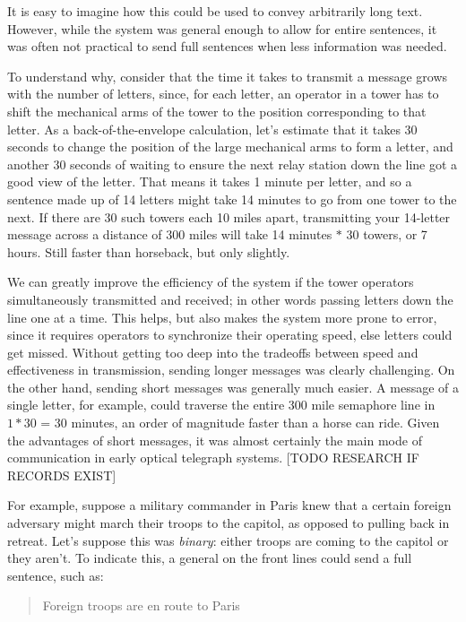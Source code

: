 \documentclass[UTF8]{book}
\begin{document}
\begin{CJK}{UTF8}{gbsn}
It is easy to imagine how this could be used to convey arbitrarily long text. However, while the system was general enough to allow for entire sentences, it was often not practical to send full sentences when less information was needed.

To understand why, consider that the time it takes to transmit a message grows with the number of letters, since, for each letter, an operator in a tower has to shift the mechanical arms of the tower to the position corresponding to that letter. As a back-of-the-envelope calculation, let's estimate that it takes 30 seconds to change the position of the large mechanical arms to form a letter, and another 30 seconds of waiting to ensure the next relay station down the line got a good view of the letter. That means it takes 1 minute per letter, and so a sentence made up of 14 letters might take 14 minutes to go from one tower to the next. If there are 30 such towers each 10 miles apart, transmitting your 14-letter message across a distance of 300 miles will take 14 minutes $*$ 30 towers, or 7 hours. Still faster than horseback, but only slightly.

We can greatly improve the efficiency of the system if the tower operators simultaneously transmitted and received; in other words passing letters down the line one at a time. This helps, but also makes the system more prone to error, since it requires operators to synchronize their operating speed, else letters could get missed. Without getting too deep into the tradeoffs between speed and effectiveness in transmission, sending longer messages was clearly challenging. On the other hand, sending short messages was generally much easier. A message of a single letter, for example, could traverse the entire 300 mile semaphore line in $1 * 30$ = 30 minutes, an order of magnitude faster than a horse can ride. Given the advantages of short messages, it was almost certainly the main mode of communication in early optical telegraph systems. [TODO RESEARCH IF RECORDS EXIST]

For example, suppose a military commander in Paris knew that a certain foreign adversary might march their troops to the capitol, as opposed to pulling back in retreat. Let's suppose this was \emph{binary}: either troops are coming to the capitol or they aren't. To indicate this, a general on the front lines could send a full sentence, such as:

\begin{quotation}
Foreign troops are en route to Paris
\end{quotation}


\end{CJK}
\end{document}
